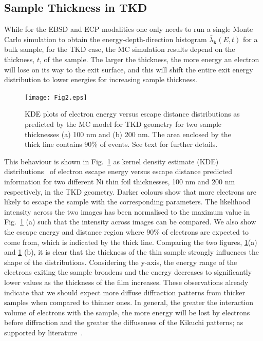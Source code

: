 %
\subsection{Sample Thickness in TKD}
\label{sec:TKDthickness}
While for the EBSD and ECP modalities one only needs to run a single Monte Carlo simulation to obtain the energy-depth-direction histogram $\bar{\lambda}_{\mathbf{k}}(E,t)$ for a bulk sample, for the TKD case, the MC simulation results depend on the thickness, $t$, of the sample.
The larger the thickness, the more energy an electron will lose on its way to the exit surface, and this will shift the entire exit energy distribution to lower energies for increasing sample thickness. 


\begin{figure}[ht]
\centering\leavevmode
\texttt{[image: Fig2.eps]}%
\caption{\label{fig:E_z_KDE}KDE plots of electron energy versus escape distance distributions as predicted by the MC model for TKD geometry for two sample thicknesses (a) 100 nm and (b) 200 nm. The area enclosed by the thick line contains 90$\%$ of events. See text for further details. }
\end{figure}

This behaviour is shown in Fig.~\ref{fig:E_z_KDE} as kernel density estimate (KDE) distributions~\cite{KDE} of electron escape energy versus escape distance predicted information for two different Ni thin foil thicknesses, 100 nm and 200 nm respectively, in the TKD geometry. Darker colours show that more electrons are likely to escape the sample with the corresponding parameters. The likelihood intensity across the two images has been normalised to the maximum value in Fig.~\ref{fig:E_z_KDE} (a) such that the intensity across images can be compared. We also show the escape energy and distance region where 90$\%$ of electrons are expected to come from, which is indicated by the thick line. Comparing the two figures, \ref{fig:E_z_KDE}(a) and \ref{fig:E_z_KDE} (b), it is clear that the thickness of the thin sample strongly influences the shape of the distributions. Considering the y-axis, the energy range of the electrons exiting the sample broadens and the energy decreases to significantly lower values as the thickness of the film increases. These observations already indicate that we should expect more diffuse diffraction patterns from thicker samples when compared to thinner ones. In general, the greater the interaction volume of electrons with the sample, the more energy will be lost by electrons before diffraction and the greater the diffuseness of the Kikuchi patterns; as supported by literature~\cite{rice2014}. 

